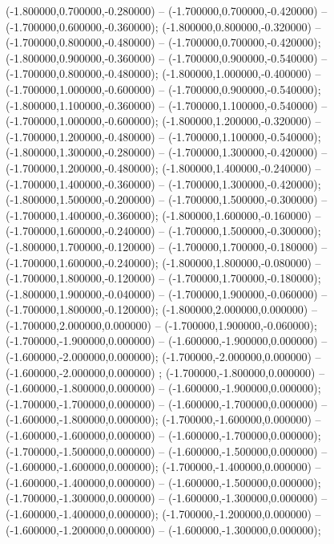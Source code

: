  (-1.800000,0.700000,-0.280000) -- (-1.700000,0.700000,-0.420000) -- (-1.700000,0.600000,-0.360000);
 (-1.800000,0.800000,-0.320000) -- (-1.700000,0.800000,-0.480000) -- (-1.700000,0.700000,-0.420000);
 (-1.800000,0.900000,-0.360000) -- (-1.700000,0.900000,-0.540000) -- (-1.700000,0.800000,-0.480000);
 (-1.800000,1.000000,-0.400000) -- (-1.700000,1.000000,-0.600000) -- (-1.700000,0.900000,-0.540000);
 (-1.800000,1.100000,-0.360000) -- (-1.700000,1.100000,-0.540000) -- (-1.700000,1.000000,-0.600000);
 (-1.800000,1.200000,-0.320000) -- (-1.700000,1.200000,-0.480000) -- (-1.700000,1.100000,-0.540000);
 (-1.800000,1.300000,-0.280000) -- (-1.700000,1.300000,-0.420000) -- (-1.700000,1.200000,-0.480000);
 (-1.800000,1.400000,-0.240000) -- (-1.700000,1.400000,-0.360000) -- (-1.700000,1.300000,-0.420000);
 (-1.800000,1.500000,-0.200000) -- (-1.700000,1.500000,-0.300000) -- (-1.700000,1.400000,-0.360000);
 (-1.800000,1.600000,-0.160000) -- (-1.700000,1.600000,-0.240000) -- (-1.700000,1.500000,-0.300000);
 (-1.800000,1.700000,-0.120000) -- (-1.700000,1.700000,-0.180000) -- (-1.700000,1.600000,-0.240000);
 (-1.800000,1.800000,-0.080000) -- (-1.700000,1.800000,-0.120000) -- (-1.700000,1.700000,-0.180000);
 (-1.800000,1.900000,-0.040000) -- (-1.700000,1.900000,-0.060000) -- (-1.700000,1.800000,-0.120000);
 (-1.800000,2.000000,0.000000) -- (-1.700000,2.000000,0.000000) -- (-1.700000,1.900000,-0.060000);
 (-1.700000,-1.900000,0.000000) -- (-1.600000,-1.900000,0.000000) -- (-1.600000,-2.000000,0.000000);
 (-1.700000,-2.000000,0.000000) -- (-1.600000,-2.000000,0.000000) ;
 (-1.700000,-1.800000,0.000000) -- (-1.600000,-1.800000,0.000000) -- (-1.600000,-1.900000,0.000000);
 (-1.700000,-1.700000,0.000000) -- (-1.600000,-1.700000,0.000000) -- (-1.600000,-1.800000,0.000000);
 (-1.700000,-1.600000,0.000000) -- (-1.600000,-1.600000,0.000000) -- (-1.600000,-1.700000,0.000000);
 (-1.700000,-1.500000,0.000000) -- (-1.600000,-1.500000,0.000000) -- (-1.600000,-1.600000,0.000000);
 (-1.700000,-1.400000,0.000000) -- (-1.600000,-1.400000,0.000000) -- (-1.600000,-1.500000,0.000000);
 (-1.700000,-1.300000,0.000000) -- (-1.600000,-1.300000,0.000000) -- (-1.600000,-1.400000,0.000000);
 (-1.700000,-1.200000,0.000000) -- (-1.600000,-1.200000,0.000000) -- (-1.600000,-1.300000,0.000000);
